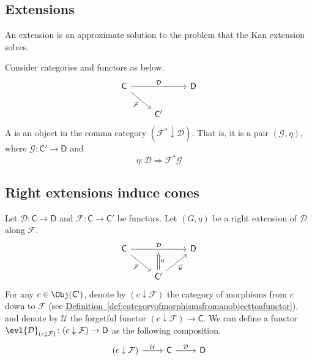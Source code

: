 \documentclass[notes.tex]{subfiles}
\begin{document}
\subsection{Extensions}
\label{ssc:extensions}

An extension is an approximate solution to the problem that the Kan extension solves.

\begin{definition}[extension]
  \label{def:extension}
  Consider categories and functors as below.
  \begin{equation*}
    \begin{tikzcd}
        \mathsf{C}
        \arrow[dr, swap, "\mathcal{F}"]
        \arrow[rr, "\mathcal{D}"]
        && \mathsf{D}
        \\
        & \mathsf{C'}
      \end{tikzcd}
  \end{equation*}
    A  is an object in the comma category $(\mathcal{F}^{*} \downarrow \mathcal{D})$. That is, it is a pair $(\mathcal{G}, \eta)$, where $\mathcal{G}\colon \mathsf{C}' \to \mathsf{D}$ and
    \begin{equation*}
      \eta\colon \mathcal{D} \Rightarrow \mathcal{F}^{*}\mathcal{G}
    \end{equation*}
\end{definition}

\subsection{Right extensions induce cones}
\label{ssc:right_extensions_induce_cones}

Let $\mathcal{D}\colon \mathsf{C} \to \mathsf{D}$ and $\mathcal{F}\colon \mathsf{C} \to \mathsf{C'}$ be functors. Let $(G, \eta)$ be a right extension of $\mathcal{D}$ along $\mathcal{F}$.
\begin{equation*}
  \begin{tikzcd}
    \mathsf{C}
    \arrow[dr, swap, "\mathcal{F}"]
    \arrow[rr, "\mathcal{D}", ""'{name=U}]
    && \mathsf{D}
    \\
    & \mathsf{C'}
    \arrow[ur, swap, "\mathcal{G}"]
    \arrow[d, to=U, Rightarrow, swap, "\eta"] 
  \end{tikzcd}
\end{equation*}
For any $c \in \Obj(\mathsf{C}')$, denote by $(c \downarrow \mathcal{F})$ the category of morphisms from $c$ down to $\mathcal{F}$ (see \hyperref[def:categoryofmorphismsfromanobjecttoafunctor]{Definition~\ref*{def:categoryofmorphismsfromanobjecttoafunctor}}), and denote by $\mathcal{U}$ the forgetful functor $(c \downarrow \mathcal{F}) \to \mathsf{C}$. We can define a functor $\evl{\mathcal{D}}_{(c \downarrow \mathcal{F})}\colon (c \downarrow \mathcal{F}) \to \mathsf{D}$ as the following composition.
\begin{equation*}
  \begin{tikzcd}
    (c \downarrow \mathcal{F})
    \arrow[r, "\mathcal{U}"]
    & \mathsf{C}
    \arrow[r, "\mathcal{D}"]
    & \mathsf{D}
  \end{tikzcd}
\end{equation*}
\end{document}
